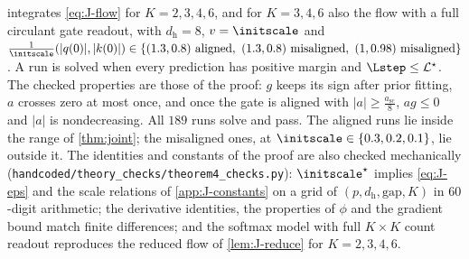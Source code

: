 \label{app:J-generalK}

 integrates \cref{eq:J-flow} for $K=2,3,4,6$, and for $K=3,4,6$ also the flow with a full circulant gate readout, with
$d_{\mathrm h}=8$, $v=\initscale$ and $\frac{1}{\initscale}(|q(0)|,|k(0)|)\in\{(1.3,0.8)\text{ aligned},\ (1.3,0.8)\text{ misaligned},\ (1,0.98)\text{ misaligned}\}$. A run is solved when every
prediction has positive margin and $\Lstep\le \mathcal L^\star$. The checked properties are those of the proof: $g$ keeps its sign after prior
fitting, $a$ crosses zero at most once, and once the gate is aligned with $|a|\ge\frac{a_{\mathrm{sc}}}{8}$, $ag\le0$ and $|a|$ is nondecreasing. All $189$ runs
solve and pass. The aligned runs lie inside the range of \cref{thm:joint}; the misaligned ones, at $\initscale\in\{0.3,0.2,0.1\}$, lie outside it.
The identities and constants of the proof are also checked mechanically (\texttt{handcoded/theory\_checks/theorem4\_checks.py}): $\initscale^\star$
implies \cref{eq:J-eps} and the scale relations of \cref{app:J-constants} on a grid of $(p,d_{\mathrm h},\mathrm{gap},K)$ in $60$-digit arithmetic; the
derivative identities, the properties of $\phi$ and the gradient bound match finite differences; and the softmax model with full
$K\times K$ count readout reproduces the reduced flow of \cref{lem:J-reduce} for $K=2,3,4,6$.

